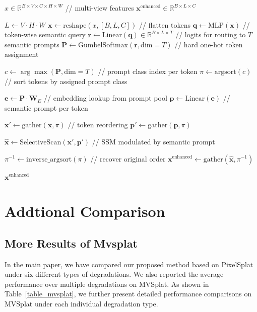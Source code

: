 \begin{algorithm}[t]
\caption{Semantic-Guided Mechanism}
\begin{algorithmic}[1]
\REQUIRE $x \in \mathbb{R}^{B \times V \times C \times H \times W}$ \hfill // multi-view features
\ENSURE ${\mathbf{x}}^\text{enhanced} \in \mathbb{R}^{B \times L \times C}$

\STATE $L \gets V \cdot H \cdot W$
\STATE $\mathbf{x} \gets \text{reshape}(x, [B, L, C])$ \hfill // flatten tokens
\STATE $\mathbf{q} \gets \text{MLP}(\mathbf{x})$ \hfill // token-wise semantic query
\STATE $\mathbf{r} \gets \text{Linear}(\mathbf{q}) \in \mathbb{R}^{B \times L \times T}$ \hfill // logits for routing to $T$ semantic prompts
\STATE $\mathbf{P} \gets \text{GumbelSoftmax}(\mathbf{r}, \text{dim}=T)$ \hfill // hard one-hot token assignment

\STATE $c \gets \arg\max(\mathbf{P}, \text{dim}=T)$ \hfill // prompt class index per token
\STATE $\pi \gets \text{argsort}(c)$ \hfill // sort tokens by assigned prompt class

\STATE $\mathbf{e} \gets \mathbf{P} \cdot \mathbf{W}_E$ \hfill // embedding lookup from prompt pool
\STATE $\mathbf{p} \gets \text{Linear}(\mathbf{e})$ \hfill // semantic prompt per token

\STATE $\mathbf{x}' \gets \text{gather}(\mathbf{x}, \pi)$ \hfill // token reordering
\STATE $\mathbf{p}' \gets \text{gather}(\mathbf{p}, \pi)$

\STATE $\hat{\mathbf{x}} \gets \text{SelectiveScan}(\mathbf{x}', \mathbf{p}')$ \hfill // SSM modulated by semantic prompt

\STATE $\pi^{-1} \gets \text{inverse\_argsort}(\pi)$ \hfill // recover original order
\STATE ${\mathbf{x}}^{\text{enhanced}} \gets \text{gather}(\hat{\mathbf{x}}, \pi^{-1})$

\RETURN ${\mathbf{x}}^\text{enhanced}$
\end{algorithmic}
\label{alg:semantic}
\end{algorithm}





\section{Addtional Comparison}
\subsection{More Results of Mvsplat}
In the main paper, we have compared our proposed method based on PixelSplat under six different types of degradations. We also reported the average performance over multiple degradations on MVSplat. As shown in Table~\ref{table_mvsplat}, we further present detailed performance comparisons on MVSplat under each individual degradation type.

